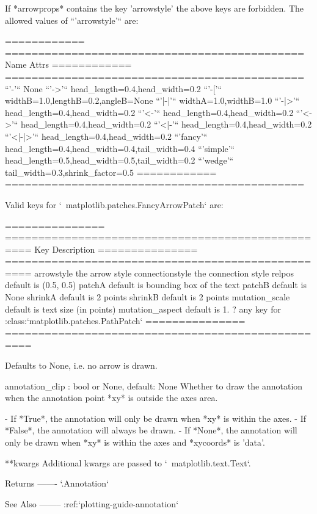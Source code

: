 \begin{DoxyVerb}
    If *arrowprops* contains the key 'arrowstyle' the
    above keys are forbidden.  The allowed values of
    ``'arrowstyle'`` are:

    ============   =============================================
    Name           Attrs
    ============   =============================================
    ``'-'``        None
    ``'->'``       head_length=0.4,head_width=0.2
    ``'-['``       widthB=1.0,lengthB=0.2,angleB=None
    ``'|-|'``      widthA=1.0,widthB=1.0
    ``'-|>'``      head_length=0.4,head_width=0.2
    ``'<-'``       head_length=0.4,head_width=0.2
    ``'<->'``      head_length=0.4,head_width=0.2
    ``'<|-'``      head_length=0.4,head_width=0.2
    ``'<|-|>'``    head_length=0.4,head_width=0.2
    ``'fancy'``    head_length=0.4,head_width=0.4,tail_width=0.4
    ``'simple'``   head_length=0.5,head_width=0.5,tail_width=0.2
    ``'wedge'``    tail_width=0.3,shrink_factor=0.5
    ============   =============================================

    Valid keys for `~matplotlib.patches.FancyArrowPatch` are:

    ===============  ==================================================
    Key              Description
    ===============  ==================================================
    arrowstyle       the arrow style
    connectionstyle  the connection style
    relpos           default is (0.5, 0.5)
    patchA           default is bounding box of the text
    patchB           default is None
    shrinkA          default is 2 points
    shrinkB          default is 2 points
    mutation_scale   default is text size (in points)
    mutation_aspect  default is 1.
    ?                any key for :class:`matplotlib.patches.PathPatch`
    ===============  ==================================================

    Defaults to None, i.e. no arrow is drawn.

annotation_clip : bool or None, default: None
    Whether to draw the annotation when the annotation point *xy* is
    outside the axes area.

    - If *True*, the annotation will only be drawn when *xy* is
      within the axes.
    - If *False*, the annotation will always be drawn.
    - If *None*, the annotation will only be drawn when *xy* is
      within the axes and *xycoords* is 'data'.

**kwargs
    Additional kwargs are passed to `~matplotlib.text.Text`.

Returns
-------
`.Annotation`

See Also
--------
:ref:`plotting-guide-annotation`\end{DoxyVerb}
 

